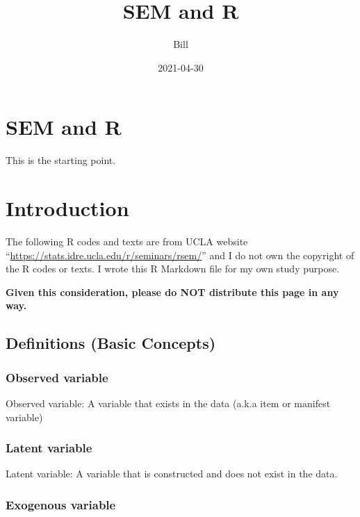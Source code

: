 \documentclass[]{book}
\title{SEM and R}
\author{Bill}
\date{2021-04-30}
\begin{document}
\maketitle

{
\setcounter{tocdepth}{1}
\tableofcontents
}
\hypertarget{sem-and-r}{%
\chapter{SEM and R}\label{sem-and-r}}

This is the starting point.

\hypertarget{intro}{%
\chapter{Introduction}\label{intro}}

The following R codes and texts are from UCLA website ``\url{https://stats.idre.ucla.edu/r/seminars/rsem/}'' and I do not own the copyright of the R codes or texts. I wrote this R Markdown file for my own study purpose.

\textbf{Given this consideration, please do NOT distribute this page in any way.}

\hypertarget{definitions-basic-concepts}{%
\section{Definitions (Basic Concepts)}\label{definitions-basic-concepts}}

\hypertarget{observed-variable}{%
\subsection{Observed variable}\label{observed-variable}}

Observed variable: A variable that exists in the data (a.k.a item or manifest variable)

\hypertarget{latent-variable}{%
\subsection{Latent variable}\label{latent-variable}}

Latent variable: A variable that is constructed and does not exist in the data.

\hypertarget{exogenous-variable}{%
\subsection{Exogenous variable}\label{exogenous-variable}}
\end{document}
